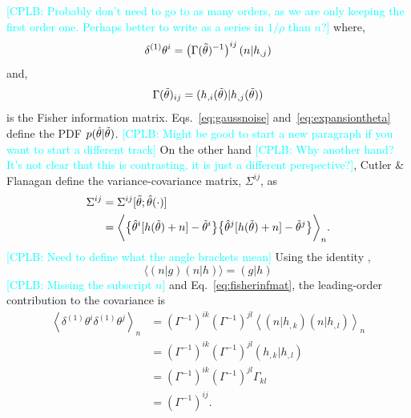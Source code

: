 \documentclass[a4paper,12pt]{article}
\newcommand{\cplb}[1]{\textcolor{cyan}{[CPLB: #1]}}
\begin{document}
\cplb{Probably don't need to go to as many orders, as we are only keeping the first order one. Perhaps better to write as a series in $1/\rho$ than $n$?}
where,
\begin{equation}
\delta^{(1)}\theta^{i} = \left( \Gamma(\Tilde{\theta})^{-1}\right)^{ij}(n|h_{,j})
\label{eq:leadordercorr}
\end{equation}
and,
\begin{equation}
\Gamma(\Tilde{\theta})_{ij} = (h_{,i}(\Tilde{\theta})|h_{,j}(\Tilde{\theta}))
\label{eq:fisherinfmat}
\end{equation}
is the Fisher information matrix. 
Eqs.~\eqref{eq:gaussnoise} and~\eqref{eq:expansiontheta} define the PDF $p(\hat{\theta}|\Tilde{\theta})$. \cplb{Might be good to start a new paragraph if you want to start a different track} On the other hand \cplb{Why another hand? It's not clear that this is contrasting, it is just a different perspective?}, Cutler \& Flanagan \cite{cutler1994gravitational} define the variance-covariance matrix, $\Sigma^{ij}$, as
\begin{align}
    \Sigma^{ij} &= \Sigma^{ij}[\Tilde{\theta};\hat{\theta}(\cdot)] \notag \\
    &= \bigg\langle \big\{\hat{\theta}^{i}[h(\Tilde{\theta})+n]-\Tilde{\theta}^{i}\big\} 
    \big\{\hat{\theta}^{j}[h(\Tilde{\theta})+n]-\Tilde{\theta}^{j}\big\} \bigg\rangle_{n}.
    \label{eq:var_cov}
\end{align}
\cplb{Need to define what the angle brackets mean}
Using the identity \cite{finn1992detection},
\begin{equation}
\langle(n|g) (n|h)\rangle = (g|h)
\label{eq:innerid}
\end{equation}
\cplb{Missing the subscript $n$}
and Eq.~\eqref{eq:fisherinfmat}, the leading-order contribution to the covariance is
\begin{equation}
    \begin{aligned}
        \left\langle
        \delta^{(1)}\theta^i\delta^{(1)}\theta^j\right\rangle_n  
        &= (\Gamma^{-1})^{ik}(\Gamma^{-1})^{jl}\left\langle(n|h_{,k})(n|h_{,l})\right\rangle_n \\    
        &= (\Gamma^{-1})^{ik}(\Gamma^{-1})^{jl}(h_{,k}|h_{,l})  \\         
        &= (\Gamma^{-1})^{ik}(\Gamma^{-1})^{jl}\Gamma_{kl}  \\      
        &= (\Gamma^{-1})^{ij}.
    \end{aligned}    
\label{eq:fishercovderivation}
\end{equation}
\end{document}
